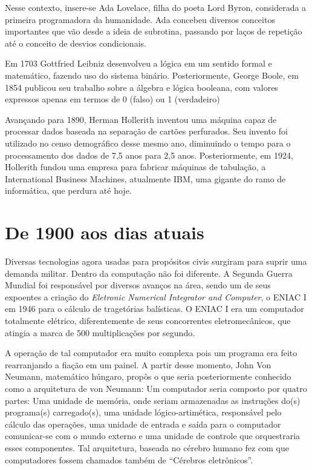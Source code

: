 \documentclass[brazil,times]{abnt}
\begin{document}
Nesse contexto, insere-se Ada Lovelace, filha do poeta Lord Byron, considerada a
primeira programadora da humanidade. Ada concebeu diversos conceitos importantes
que vão desde a ideia de subrotina, passando por laços de repetição até o
conceito de desvios condicionais.

Em 1703 Gottfried Leibniz desenvolveu a lógica em um sentido formal e matemático,
fazendo uso do sistema binário. Posteriormente, George Boole, em 1854 publicou
seu trabalho sobre a álgebra e lógica booleana, com valores expressos apenas em
termos de 0 (falso) ou 1 (verdadeiro)

Avançando para 1890, Herman Hollerith inventou uma máquina capaz de
processar dados baseada na separação de cartões perfurados. Seu invento foi
utilizado no censo demográfico desse mesmo ano, diminuindo o tempo para o
processamento dos dados de 7,5 anos para 2,5 anos. Posteriormente, em 1924,
Hollerith fundou uma empresa para fabricar máquinas de tabulação, a
International Business Machines, atualmente IBM, uma gigante do ramo de
informática, que perdura até hoje.

\section{De 1900 aos dias atuais}
Diversas tecnologias agora usadas para propósitos civis surgiram para suprir uma
demanda militar. Dentro da computação não foi diferente. A Segunda Guerra
Mundial foi responsável por diversos avanços na área, sendo um de seus expoentes
a criação do \emph{Eletronic Numerical Integrator and Computer}, o ENIAC I em
1946 para o cálculo de tragetórias balísticas. O ENIAC I era um computador
totalmente elétrico, diferentemente de seus concorrentes eletromecânicos, que
atingia a marca de 500 multiplicações por segundo. \cite{introducao-ilustrada-computacao}

A operação de tal computador era muito complexa pois um programa era feito
rearranjando a fiação em um painel. A partir desse momento, John Von Neumann,
matemático húngaro, propôs o que seria posteriormente conhecido como a
arquitetura de von Neumann: Um computador seria composto por quatro partes: Uma
unidade de memória, onde seriam armazenadas as instruções do(s) programa(s)
carregado(s), uma unidade lógico-artimética, responsável pelo cálculo das
operações, uma unidade de entrada e saída para o computador comunicar-se com o
mundo externo e uma unidade de controle que orquestraria esses componentes. Tal
arquitetura, baseada no cérebro humano fez com que computadores fossem chamados
também de ``Cérebros eletrônicos''.\cite{wiki:historia-computacao}
\end{document}
